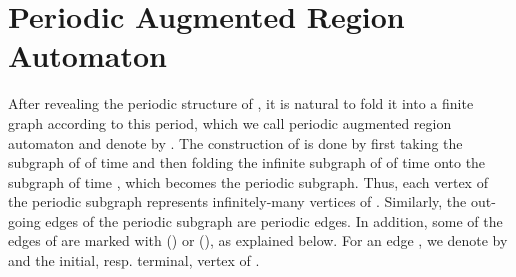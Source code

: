 \documentclass[11pt]{amsart}
\theoremstyle{definition}
\begin{document}
\section{Periodic Augmented Region Automaton}
\label{sec:APARA}
After revealing the periodic structure of , it is natural to fold it into a finite graph according to this period, which we call periodic augmented region automaton and denote by .
The construction of  is done by first taking the subgraph of  of time  and then folding the infinite subgraph of  of time  onto the subgraph of time , which becomes the periodic subgraph.
Thus, each vertex of the periodic subgraph represents infinitely-many vertices of .
Similarly, the out-going edges of the periodic subgraph are periodic edges.
In addition, some of the edges of  are marked with () or (), as explained below.
For an edge , we denote by  and  the initial, resp. terminal, vertex of . 
\end{document}
